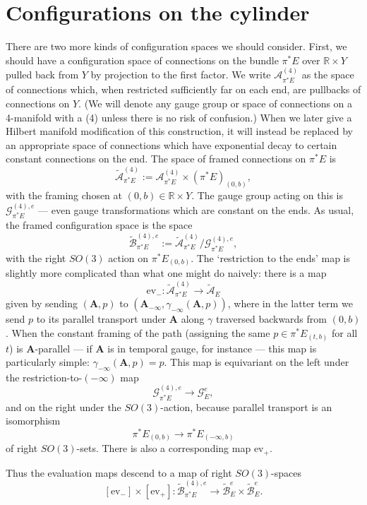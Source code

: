 \documentclass[10pt,a4paper]{amsart}
\newcommand{\pE}{\pi^* \! E}
\theoremstyle{definition}
\theoremstyle{remark}
\numberwithin{figure}{qchap}
\begin{document}
\section{Configurations on the cylinder}\label{sec:config-cyl}
There are two more kinds of configuration spaces we should consider. First, we should have a configuration space of connections on the bundle $\pE$ over $\mathbb R \times Y$ pulled back from $Y$ by projection to the first factor. We write $\mathcal A^{(4)}_{\pE}$ as the space of connections which, when restricted sufficiently far on each end, are pullbacks of connections on $Y$. (We will denote any gauge group or space of connections on a 4-manifold with a (4) unless there is no risk of confusion.) When we later give a Hilbert manifold modification of this construction, it will instead be replaced by an appropriate space of connections which have exponential decay to certain constant connections on the end. The space of framed connections on $\pE$ is $$\widetilde{\mathcal A}^{(4)}_{\pE} := \mathcal A^{(4)}_{\pE} \times (\pE)_{(0,b)},$$ with the framing chosen at $(0,b) \in \mathbb R \times Y$. The gauge group acting on this is $\mathcal G^{(4),e}_{\pE}$ --- even gauge transformations which are constant on the ends. As usual, the framed configuration space is the space $$\widetilde{\mathcal B}^{(4),e}_{\pE} := \widetilde{\mathcal A}^{(4)}_{\pE}/\mathcal G^{(4),e}_{\pE},$$ with the right $SO(3)$ action on $\pE_{(0,b)}$. The `restriction to the ends' map is slightly more complicated than what one might do naively: there is a map $$\text{ev}_-: \widetilde{\mathcal A}^{(4)}_{\pE} \to \widetilde{\mathcal A}_{E}$$ given by sending $(\mathbf{A}, p)$ to $(\mathbf{A}_{-\infty}, \gamma_{-\infty}(\mathbf{A}, p))$, where in the latter term we send $p$ to its parallel transport under $\mathbf{A}$ along $\gamma$ traversed backwards from $(0,b)$. When the constant framing of the path (assigning the same $p \in \pE_{(t,b)}$ for all $t$) is $\mathbf{A}$-parallel --- if $\mathbf{A}$ is in temporal gauge, for instance --- this map is particularly simple: $\gamma_{-\infty}(\mathbf{A}, p) = p$. This map is equivariant on the left under the restriction-to-$(-\infty)$ map $$\mathcal G^{(4),e}_{\pE} \to \mathcal G^e_E,$$ and on the right under the $SO(3)$-action, because parallel transport is an isomorphism $$\pE_{(0,b)} \to \pE_{(-\infty,b)}$$ of right $SO(3)$-sets. There is also a corresponding map $\text{ev}_+$.

Thus the evaluation maps descend to a map of right $SO(3)$-spaces $$[\text{ev}_-] \times [\text{ev}_+]: \widetilde{\mathcal B}^{(4),e}_{\pE} \to \widetilde{\mathcal B}^e_{E} \times \widetilde{\mathcal B}^e_{E}.$$
\end{document}
